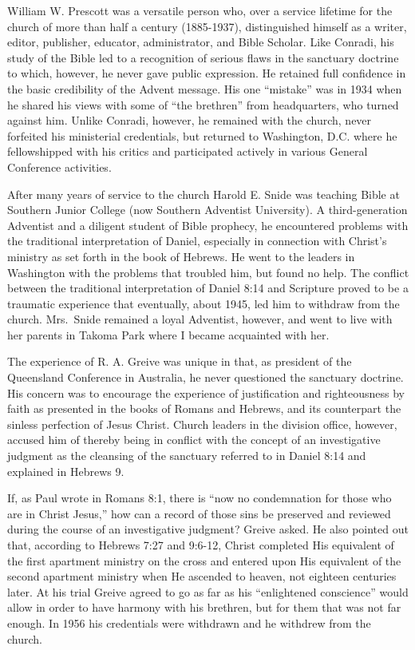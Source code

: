 William W. Prescott was a versatile person who, over a service lifetime for
the church of more than half a century (1885-1937), distinguished himself as
a writer, editor, publisher, educator, administrator, and Bible Scholar.
Like Conradi, his study of the Bible led to a recognition of serious flaws
in the sanctuary doctrine to which, however, he never gave public
expression. He retained full confidence in the basic credibility of the
Advent message. His one ``mistake'' was in 1934 when he shared his views with
some of ``the brethren'' from headquarters, who turned against him. Unlike
Conradi, however, he remained with the church, never forfeited his
ministerial credentials, but returned to Washington, D.C. where he
fellowshipped with his critics and participated actively in various General
Conference activities.

After many years of service to the church Harold E. Snide was teaching Bible
at Southern Junior College (now Southern Adventist University). A
third-generation Adventist and a diligent student of Bible prophecy, he
encountered problems with the traditional interpretation of Daniel,
especially in connection with Christ's ministry as set forth in the book of
Hebrews. He went to the leaders in Washington with the problems that
troubled him, but found no help. The conflict between the traditional
interpretation of Daniel 8:14 and Scripture proved to be a traumatic
experience that eventually, about 1945, led him to withdraw from the church.
Mrs.\ Snide remained a loyal Adventist, however, and went to live with her
parents in Takoma Park where I became acquainted with her. 

The experience of R. A. Greive was unique in that, as president of the
Queensland Conference in Australia, he never questioned the sanctuary
doctrine. His concern was to encourage the experience of justification and
righteousness by faith as presented in the books of Romans and Hebrews, and
its counterpart the sinless perfection of Jesus Christ. Church leaders in
the division office, however, accused him of thereby being in conflict with
the concept of an investigative judgment as the cleansing of the sanctuary
referred to in Daniel 8:14 and explained in Hebrews 9.

If, as Paul wrote in Romans 8:1, there is ``now no condemnation for those who
are in Christ Jesus,'' how can a record of those sins be preserved and
reviewed during the course of an investigative judgment? Greive asked. He
also pointed out that, according to Hebrews 7:27 and 9:6-12, Christ
completed His equivalent of the first apartment ministry on the cross and
entered upon His equivalent of the second apartment ministry when He
ascended to heaven, not eighteen centuries later. At his trial Greive agreed
to go as far as his ``enlightened conscience'' would allow in order to have 
harmony with his brethren, but for them that was not far enough. In 1956 his
credentials were withdrawn and he withdrew from the church.

